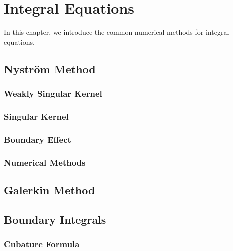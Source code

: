 \chapter{Integral Equations}
In this chapter, we introduce the common numerical methods for integral equations.  
\section{Nystr\"om Method}
\subsection{Weakly Singular Kernel}
\subsection{Singular Kernel}
\subsection{Boundary Effect}
\subsection{Numerical Methods}

\section{Galerkin Method}

\section{Boundary Integrals}

\subsection{Cubature Formula}